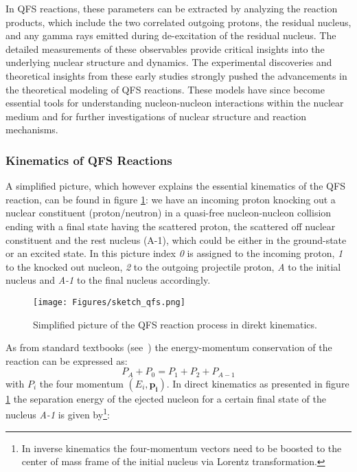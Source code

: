 In QFS reactions, these parameters can be extracted by analyzing the reaction products, which include the two correlated outgoing protons, the residual nucleus, and any gamma rays emitted during de-excitation of the residual nucleus. The detailed measurements of these observables provide critical insights into the underlying nuclear structure and dynamics.\newline
The experimental discoveries and theoretical insights from these early studies strongly pushed the advancements in the theoretical modeling of QFS reactions. These models have since become essential tools for understanding nucleon-nucleon interactions within the nuclear medium and for further investigations of nuclear structure and reaction mechanisms.\newline
\subsubsection{Kinematics of QFS Reactions}\label{sec:kin_qfs}
A simplified picture, which however explains the essential kinematics of the QFS reaction, can be found in figure \ref{fig:sketch_qfs}: we have an incoming proton knocking out a nuclear constituent (proton/neutron) in a quasi-free nucleon-nucleon collision ending with a final state having the scattered proton, the scattered  off nuclear constituent and the rest nucleus (A-1), which could be either in the ground-state or an excited state. In this picture index \textit{0} is assigned to the incoming proton, \textit{1} to the knocked out nucleon, \textit{2} to the outgoing projectile proton, \textit{A} to the initial nucleus and  \textit{A-1} to the final nucleus accordingly.
\begin{figure}[htpb]
    \centering
    \texttt{[image: Figures/sketch\_qfs.png]}
    \caption{
   	Simplified picture of the QFS reaction process in direkt kinematics.  
    }
    \label{fig:sketch_qfs}
\end{figure}
As from standard textbooks (see~\cite[Chapter~6.2]{povh2013teilchen}) the energy-momentum conservation of the reaction can be expressed as:
\begin{equation}\label{eq:four_mom_cons_qfs}
P_A  +  P_0 = P_1 + P_2 +P_{A-1} 
\end{equation}
with $P_i$ the four momentum $(E_i,\mathbf{p_i})$.\newline
In direct kinematics as presented in figure \ref{fig:sketch_qfs} the separation energy  of the ejected nucleon for a certain final state of the nucleus \textit{A-1} is given by\footnote{In inverse kinematics the four-momentum vectors need to be boosted to the center of mass frame of the initial nucleus via Lorentz transformation.}:
